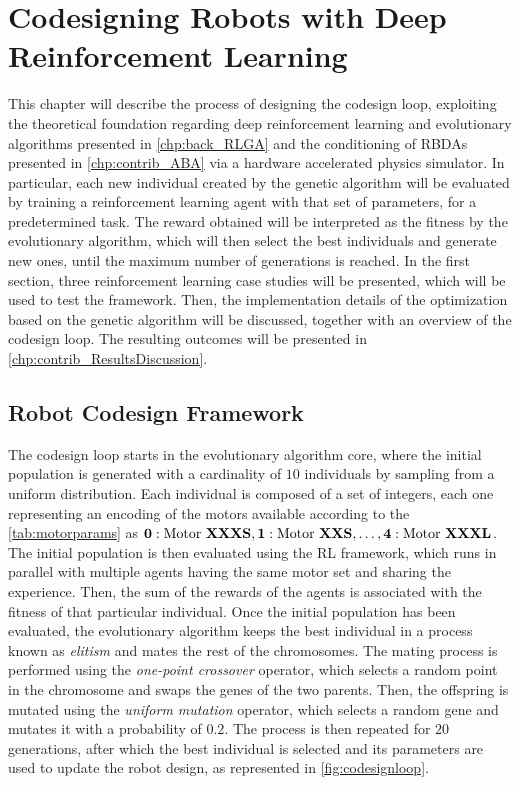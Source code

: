 \chapter{Codesigning Robots with Deep Reinforcement Learning}
\label{chp:contrib_CodesignRL}

This chapter will describe the process of designing the codesign loop, exploiting the theoretical foundation regarding deep reinforcement learning and evolutionary algorithms presented in \cref{chp:back_RLGA} and the conditioning of \ac{RBDA}s presented in \cref{chp:contrib_ABA} via a hardware accelerated physics simulator. In particular, each new individual created by the genetic algorithm will be evaluated by training a reinforcement learning agent with that set of parameters, for a predetermined task. The reward obtained will be interpreted as the fitness by the evolutionary algorithm, which will then select the best individuals and generate new ones, until the maximum number of generations is reached. In the first section, three reinforcement learning case studies will be presented, which will be used to test the framework. Then, the implementation details of the optimization based on the genetic algorithm will be discussed, together with an overview of the codesign loop. The resulting outcomes will be presented in \cref{chp:contrib_ResultsDiscussion}.


\section{Robot Codesign Framework}
\label{sec:Codesign}

The codesign loop starts in the evolutionary algorithm core, where the initial population is generated with a cardinality of $10$ individuals by sampling from a uniform distribution. Each individual is composed of a set of integers, each one representing an encoding of the motors available according to the \cref{tab:motorparams} as $\mathbf{0}: \text{Motor \textbf{XXXS}}, \mathbf{1}:\text{Motor \textbf{XXS}}, \dots, \mathbf{4}:\text{Motor \textbf{XXXL}}$. The initial population is then evaluated using the \ac{RL} framework, which runs in parallel with multiple agents having the same motor set and sharing the experience. Then, the sum of the rewards of the agents is associated with the fitness of that particular individual. Once the initial population has been evaluated, the evolutionary algorithm keeps the best individual in a process known as \textit{elitism} and mates the rest of the chromosomes. The mating process is performed using the \textit{one-point crossover} operator, which selects a random point in the chromosome and swaps the genes of the two parents. Then, the offspring is mutated using the \textit{uniform mutation} operator, which selects a random gene and mutates it with a probability of $0.2$. The process is then repeated for $20$ generations, after which the best individual is selected and its parameters are used to update the robot design, as represented in \cref{fig:codesignloop}.

